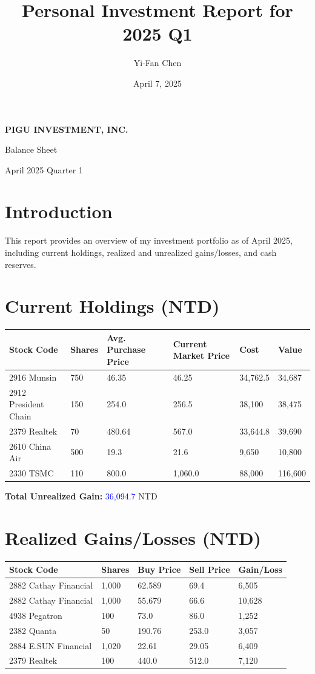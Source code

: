 \documentclass[a4paper,12pt]{article}
\title{\textbf{Personal Investment Report for 2025 Q1}}
\author{Yi-Fan Chen}
\date{April 7, 2025}
\begin{document}
\begin{titlepage}
    \centering
    \vspace*{\fill}
    {\Huge \textbf{PIGU INVESTMENT, INC.} \par}
    \vspace{1.5cm}
    {\LARGE Balance Sheet \par}
    \vspace{2cm}
    {\Large April 2025 Quarter 1 \par}
    \vspace*{\fill}
\end{titlepage}


\section{Introduction}
This report provides an overview of my investment portfolio as of April 2025, including current holdings, realized and unrealized gains/losses, and cash reserves.

\section{Current Holdings (NTD)}
\begin{longtable}{llllll}
    \toprule
    Stock Code & Shares & Avg. Purchase Price & Current Market Price & Cost & Value \\
    \midrule
    2916 Munsin       & 750  & 46.35 & 46.25 & 34,762.5 & 34,687 \\
    2912 President Chain & 150 & 254.0  & 256.5  & 38,100  & 38,475 \\
    2379 Realtek      & 70   & 480.64 & 567.0 & 33,644.8 & 39,690 \\
    2610 China Air    & 500  & 19.3   & 21.6  & 9,650   & 10,800 \\
    2330 TSMC         & 110  & 800.0 & 1,060.0 & 88,000  & 116,600 \\
    \bottomrule
\end{longtable}
\textbf{Total Unrealized Gain:} \textcolor{blue}{36,094.7} NTD

\section{Realized Gains/Losses (NTD)}
\begin{longtable}{lllll}
    \toprule
    Stock Code & Shares & Buy Price & Sell Price & Gain/Loss \\
    \midrule
    2882 Cathay Financial & 1,000 & 62.589 & 69.4 & 6,505 \\
    2882 Cathay Financial & 1,000 & 55.679 & 66.6 & 10,628 \\
    4938 Pegatron & 100 & 73.0 & 86.0 & 1,252 \\
    2382 Quanta & 50 & 190.76 & 253.0 & 3,057 \\
    2884 E.SUN Financial & 1,020 & 22.61 & 29.05 & 6,409 \\
    2379 Realtek & 100 & 440.0 & 512.0 & 7,120 \\
    \bottomrule
\end{longtable}
\end{document}
